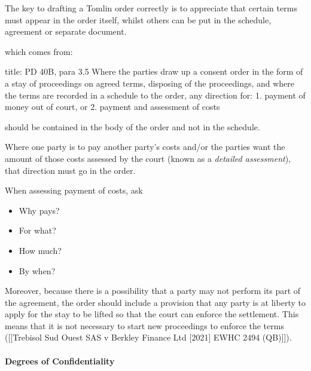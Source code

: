 \documentclass[
]{article}
\newenvironment{Shaded}{}{}
\newcommand{\NormalTok}[1]{#1}
\providecommand{\tightlist}{%
  \setlength{\itemsep}{0pt}\setlength{\parskip}{0pt}}
\begin{document}
\begin{Shaded}
\begin{Highlighting}[]
\NormalTok{The key to drafting a Tomlin order correctly is to appreciate that certain terms must appear in the order itself, whilst others can be put in the schedule, agreement or separate document.}
\end{Highlighting}
\end{Shaded}

which comes from:

\begin{Shaded}
\begin{Highlighting}[]
\NormalTok{title: PD 40B, para 3.5}
\NormalTok{Where the parties draw up a consent order in the form of a stay of proceedings on agreed terms, disposing of the proceedings, and where the terms are recorded in a schedule to the order, any direction for:}
\NormalTok{1. payment of money out of court, or}
\NormalTok{2. payment and assessment of costs}

\NormalTok{should be contained in the body of the order and not in the schedule.}
\end{Highlighting}
\end{Shaded}

Where one party is to pay another party's costs and/or the parties want
the amount of those costs assessed by the court (known as a
\emph{detailed assessment}), that direction must go in the order.

When assessing payment of costs, ask

\begin{itemize}
\tightlist
\item
  Why pays?
\item
  For what?
\item
  How much?
\item
  By when?
\end{itemize}

Moreover, because there is a possibility that a party may not perform
its part of the agreement, the order should include a provision that any
party is at liberty to apply for the stay to be lifted so that the court
can enforce the settlement. This means that it is not necessary to start
new proceedings to enforce the terms ({[}{[}Trebisol Sud Ouest SAS v
Berkley Finance Ltd {[}2021{]} EWHC 2494 (QB){]}{]}).

\hypertarget{degrees-of-confidentiality}{%
\paragraph{Degrees of
Confidentiality}\label{degrees-of-confidentiality}}
\end{document}
